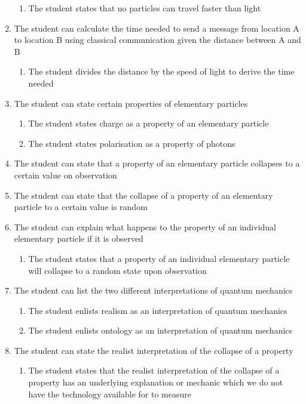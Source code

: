 \documentclass[11pt,twoside]{report} %
\begin{document}
\begin{enumerate}
\begin{enumerate}
\item The student states that no particles can travel faster than light
\end{enumerate}
\item The student can calculate the time needed to send a message from location A to location B using classical communication given the distance between A and B
\begin{enumerate}
\item The student divides the distance by the speed of light to derive the time needed
\end{enumerate}
\item The student can state certain properties of elementary particles
\begin{enumerate}
\item The student states charge as a property of an elementary particle
\item The student states polarisation as a property of photons
\end{enumerate}
\item The student can state that a property of an elementary particle collapses to a certain value on observation
\item The student can state that the collapse of a property of an elementary particle to a certain value is random
\item The student can explain what happens to the property of an individual elementary particle if it is observed
\begin{enumerate}
\item The student states that a property of an individual elementary particle will collapse to a random state upon observation
\end{enumerate}
\item The student can list the two different interpretations of quantum mechanics
\begin{enumerate}
\item The student enlists realism as an interpretation of quantum mechanics
\item The student enlists ontology as an interpretation of quantum mechanics
\end{enumerate}
\item The student can state the realist interpretation of the collapse of a property
\begin{enumerate}
\item The student states that the realist interpretation of the collapse of a property has an underlying explanation or mechanic which we do not have the technology available for to measure

\end{enumerate}
\end{enumerate}
\end{document}
